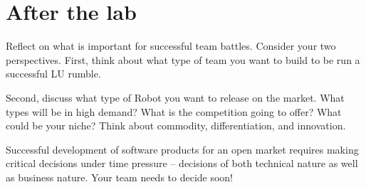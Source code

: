 \documentclass{scrreprt}
\begin{document}
\chapter{After the lab}
Reflect on what is important for successful team battles. Consider your two perspectives. First, think about what type of team you want to build to be run a successful LU rumble.

Second, discuss what type of Robot you want to release on the market. What types will be in high demand? What is the competition going to offer? What could be your niche? Think about commodity, differentiation, and innovation.

Successful development of software products for an open market requires making critical decisions under time pressure -- decisions of both technical nature as well as business nature. Your team needs to decide soon!
\end{document}
